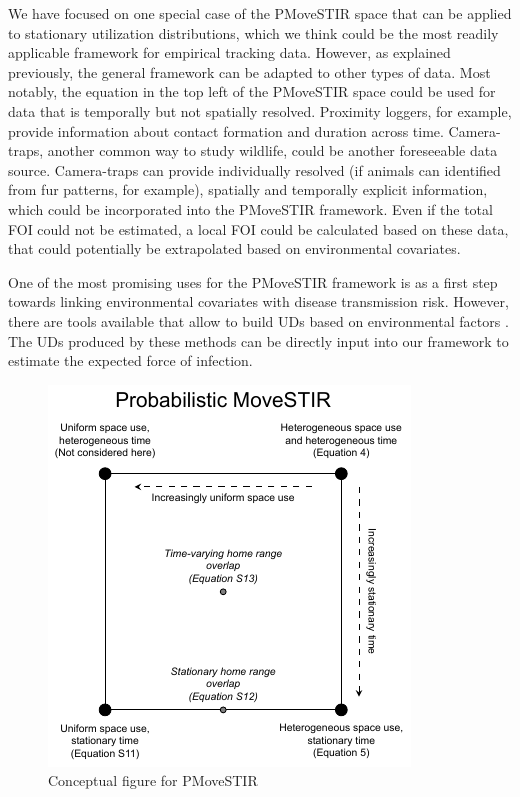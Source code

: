 \documentclass[letterpaper]{article}
\begin{document}
We have focused on one special case of the PMoveSTIR space that can be applied to stationary utilization distributions, which we think could be the most readily applicable framework for empirical tracking data. 
However, as explained previously, the general framework can be adapted to other types of data. Most notably, the equation in the top left of the PMoveSTIR space could be used for data that is temporally but not spatially resolved. Proximity loggers, for example, provide information about contact formation and duration across time. 
Camera-traps, another common way to study wildlife, could be another foreseeable data source. Camera-traps can provide individually resolved (if animals can identified from fur patterns, for example), spatially and temporally explicit information, which could be incorporated into the PMoveSTIR framework. Even if the total FOI could not be estimated, a local FOI could be calculated based on these data, that could potentially be extrapolated based on environmental covariates. 

One of the most promising uses for the PMoveSTIR framework is as a first step towards linking environmental covariates with disease transmission risk. 
However, there are tools available that allow to build UDs based on environmental factors \citep{Signer2017,Michelot2020}. The UDs produced by these methods can be directly input into our framework to estimate the expected force of infection.





\begin{figure}
    \includegraphics[width=\textwidth]{figures/conceptual_figure_pmovestir.pdf}
    \caption{Conceptual figure for PMoveSTIR}
	\label{fig:square}
\end{figure}
\end{document}
